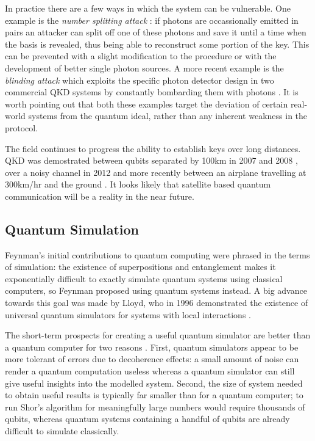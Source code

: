 In practice there are a few ways in which the system can be vulnerable. One example is the \textit{number splitting attack} \cite{qkd_number_splitting_attacks_00}: if photons are occassionally emitted in pairs an attacker can split off one of these photons and save it until a time when the basis is revealed, thus being able to reconstruct some portion of the key. This can be prevented with a slight modification to the procedure \cite{qkd_decoy_defense} or with the development of better single photon sources. A more recent example is the \textit{blinding attack} which exploits the specific photon detector design in two commercial QKD systems by constantly bombarding them with photons \cite{qkd_blinding_attack}. It is worth pointing out that both these examples target the deviation of certain real-world systems from the quantum ideal, rather than any inherent weakness in the protocol.

The field continues to progress the ability to establish keys over long distances. QKD was demostrated between qubits separated by 100km in 2007 and 2008 \cite{qkd_97km_08, qkd_144km_07}, over a noisy channel in 2012 \cite{qkd_noisy_channel_12} and more recently between an airplane travelling at 300km/hr and the ground \cite{qkd_airbourne_13}. It looks likely that satellite based quantum communication will be a reality in the near future.



\subsection{Quantum Simulation}

Feynman's initial contributions to quantum computing \cite{feynman_82} were phrased in the terms of simulation: the existence of superpositions and entanglement makes it exponentially difficult to exactly simulate quantum systems using classical computers, so Feynman proposed using quantum systems instead. A big advance towards this goal was made by Lloyd, who in 1996 demonstrated the existence of universal quantum simulators for systems with local interactions \cite{lloyd_universal_simulators}.

The short-term prospects for creating a useful quantum simulator are better than a quantum computer for two reasons \cite{simulation_ion_review}. First, quantum simulators appear to be more tolerant of errors due to decoherence effects: a small amount of noise can render a quantum computation useless whereas a quantum simulator can still give useful insights into the modelled system. Second, the size of system needed to obtain useful results is typically far smaller than for a quantum computer; to run Shor's algorithm for meaningfully large numbers would require thousands of qubits, whereas quantum systems containing a handful of qubits are already difficult to simulate classically.

